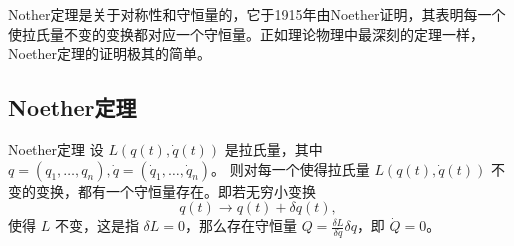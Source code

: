 
Nother定理是关于对称性和守恒量的，它于1915年由Noether证明，其表明每一个使拉氏量不变的变换都对应一个守恒量。正如理论物理中最深刻的定理一样，Noether定理的证明极其的简单。

\subsection{Noether定理}
\begin{theorem}{Noether定理}
设 $L(q(t),\dot q(t))$ 是拉氏量，其中 $q=(q_1,\ldots,q_n),\dot q=(\dot q_1,\ldots,\dot q_n)$。 则对每一个使得拉氏量 $L(q(t),\dot q(t))$ 不变的变换，都有一个守恒量存在。即若无穷小变换
\begin{equation}
q(t)\rightarrow q(t)+\delta q(t),~
\end{equation}
使得 $L$ 不变，这是指 $\delta L=0$，那么存在守恒量 $Q=\frac{\delta L}{\delta\dot q}\delta q$，即 $\dot Q=0$。
\end{theorem}
